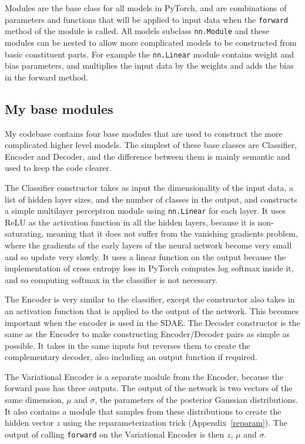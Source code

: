 Modules are the base class for all models in PyTorch, and are combinations of parameters and functions that will be applied to input 
data when the \texttt{forward} method of the module is called. All models subclass \texttt{nn.Module} and these modules can be nested
to allow more complicated models to be constructed from basic constituent parts. For example the \texttt{nn.Linear} module contains 
weight and bias parameters, and multiplies the input data by the weights and adds the bias in the forward method.

\subsection{My base modules}
My codebase contains four base modules that are used to construct the more complicated higher level models. The simplest of 
these base classes are Classifier, Encoder and Decoder, and the difference between them is mainly semantic and used to keep the
code clearer.

The Classifier constructor takes as input the dimensionality of the input data, a list of hidden layer sizes, and the number of classes 
in the output, and constructs a simple multilayer perceptron module using \texttt{nn.Linear} for each layer. It uses ReLU as the activation 
function in all the hidden layers,
because it is non-saturating, meaning that it does not suffer from the vanishing gradients problem, where the gradients of the early layers
of the neural network become very small and so update very slowly. It uses a linear function on the output because the implementation of 
cross entropy loss in PyTorch computes log softmax inside it, and so computing softmax in the classifier is not necessary.

The Encoder is very similar to the classifier, except the constructor also takes in an activation function that is applied to the output 
of the network. This becomes important when the encoder is used in the SDAE. The Decoder constructor is the same as the Encoder to make 
constructing Encoder/Decoder pairs as simple as possible. It takes in the same inputs but reverses them to create the complementary decoder,
also including an output function if required.

The Variational Encoder is a separate module from the Encoder, because the forward pass has three outputs. 
The output of the network is two vectors of the same dimension, $\mu$ and $\sigma$, the parameters of the posterior Gaussian distributions.
It also contains a module that samples from these distributions to create the hidden vector $z$ using the reparameterization trick 
(Appendix~\ref{reparam}). The output of calling \texttt{forward} on the Variational Encoder is then $z$, $\mu$ and $\sigma$.

